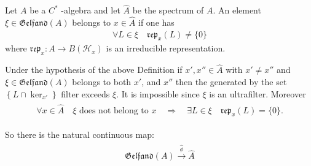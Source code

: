\documentclass{beamer}
\theoremstyle{plain}
\newcommand{\bean}{\begin{eqnarray*}}
\newcommand{\eean}{\end{eqnarray*}}
\newcommand{\rep}{\mathfrak{rep}}
\newcommand{\sH}{\mathcal{H}}       %
\begin{document}
\begin{frame}
\begin{definition}\label{belongs_defn}
	Let $A$ be a $C^*$ -algebra and let $\hat A$ be the spectrum of $A$. An element $\xi \in \mathfrak{Gelfand}\left(A \right)$  \alert{belongs to} $x \in \hat A$ if one has
	\bean\label{belongs_eqn}
	\forall L \in \xi \quad \rep_x\left(L\right) \neq \{0\} 
	\eean
	where $\rep_x : A \to B\left(\sH_x \right)$ is an irreducible representation.
	
\end{definition}

	Under the hypothesis of the above Definition   if $x', x'' \in \hat A$ with $x' \neq x''$ and $\xi\in \mathfrak{Gelfand}\left(A \right)$ belongs to both $x'$, and $x''$ then the generated by the set $\left\{ L \cap \ker_{x'}\right\}$ filter exceeds $\xi$. It is impossible since $\xi$ is an ultrafilter. Moreover
	\bean\label{not_bel}
	\begin{split}
		\forall x \in \hat A \quad \xi \text{ does not belong to } x \quad \Rightarrow \quad \exists L  \in \xi \quad \rep_x\left( L\right) = \{0\}.
	\end{split}
	\eean
	
	So there is the natural continuous map:
	\bean\label{to_spec_eqn} 
	\begin{split}
		\mathfrak{Gelfand}\left(A \right) \xrightarrow{\hat \phi} \hat A
	\end{split}
	\eean

\end{frame}
\end{document}
